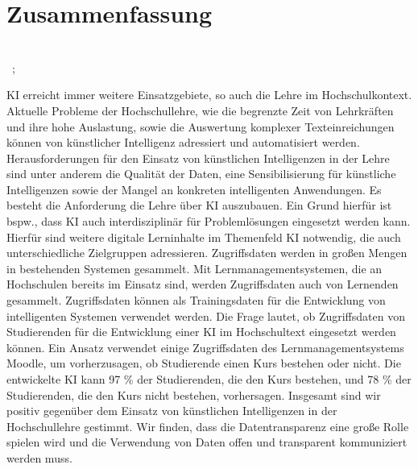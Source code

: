 \chapter*{Zusammenfassung}
\begin{center}
  \DocumentThesisTitle
  \\
  \vspace{.3cm}
  \DocumentAuthorPrename\ \DocumentAuthorName ; \DocumentSecondAuthorPrename\ \DocumentSecondAuthorName
\end{center}
\ac{KI} erreicht immer weitere Einsatzgebiete, so auch die Lehre im Hochschulkontext.
Aktuelle Probleme der Hochschullehre, wie die begrenzte Zeit von Lehrkräften und ihre hohe Auslastung, sowie die Auswertung komplexer Texteinreichungen können von künstlicher Intelligenz adressiert und automatisiert werden.
Herausforderungen für den Einsatz von künstlichen Intelligenzen in der Lehre sind unter anderem die Qualität der Daten, eine Sensibilisierung für künstliche Intelligenzen sowie der Mangel an konkreten intelligenten Anwendungen.
Es besteht die Anforderung die Lehre über \ac{KI} auszubauen. Ein Grund hierfür ist bspw., dass \ac{KI} auch interdisziplinär für Problemlösungen eingesetzt werden kann.
Hierfür sind weitere digitale Lerninhalte im Themenfeld \ac{KI} notwendig, die auch unterschiedliche Zielgruppen adressieren. Zugriffsdaten werden in großen Mengen in bestehenden Systemen gesammelt. Mit Lernmanagementsystemen, die an Hochschulen bereits im Einsatz sind, werden Zugriffsdaten auch von Lernenden gesammelt.
Zugriffsdaten können als Trainingsdaten für die Entwicklung von intelligenten Systemen verwendet werden.
Die Frage lautet, ob Zugriffsdaten von Studierenden für die Entwicklung einer \ac{KI} im Hochschultext eingesetzt werden können.
Ein Ansatz verwendet einige Zugriffsdaten des Lernmanagementsystems Moodle, um vorherzusagen, ob Studierende einen Kurs bestehen oder nicht.
Die entwickelte \ac{KI} kann 97 \% der Studierenden, die den Kurs bestehen, und 78 \% der Studierenden, die den Kurs nicht bestehen, vorhersagen.
Insgesamt sind wir positiv gegenüber dem Einsatz von künstlichen Intelligenzen in der Hochschullehre gestimmt.
Wir finden, dass die Datentransparenz eine große Rolle spielen wird und die Verwendung von Daten offen und transparent kommuniziert werden muss.

\newpage


